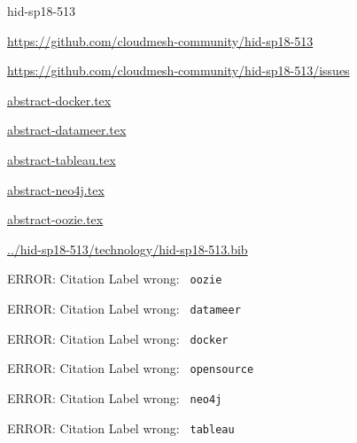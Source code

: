 \begin{IU}

hid-sp18-513

\url{https://github.com/cloudmesh-community/hid-sp18-513}

\url{https://github.com/cloudmesh-community/hid-sp18-513/issues}

\href{https://github.com/cloudmesh-community/hid-sp18-513/blob/master//technology/abstract-docker.tex}{abstract-docker.tex}

\href{https://github.com/cloudmesh-community/hid-sp18-513/blob/master//technology/abstract-datameer.tex}{abstract-datameer.tex}

\href{https://github.com/cloudmesh-community/hid-sp18-513/blob/master//technology/abstract-tableau.tex}{abstract-tableau.tex}

\href{https://github.com/cloudmesh-community/hid-sp18-513/blob/master//technology/abstract-neo4j.tex}{abstract-neo4j.tex}

\href{https://github.com/cloudmesh-community/hid-sp18-513/blob/master//technology/abstract-oozie.tex}{abstract-oozie.tex}

\href{https://github.com/cloudmesh-community/hid-sp18-513/blob/master//technology/hid-sp18-513.bib}{../hid-sp18-513/technology/hid-sp18-513.bib}

 ERROR: Citation Label wrong: \verb| oozie |

 ERROR: Citation Label wrong: \verb| datameer |

 ERROR: Citation Label wrong: \verb| docker |

 ERROR: Citation Label wrong: \verb| opensource |

 ERROR: Citation Label wrong: \verb| neo4j |

 ERROR: Citation Label wrong: \verb| tableau |

\end{IU}


